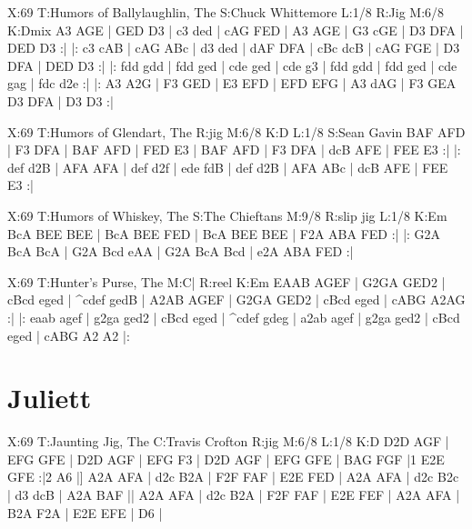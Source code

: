 \documentclass{article}
\begin{document}
\begin{abc}[name]
X:69
T:Humors of Ballylaughlin, The
S:Chuck Whittemore
L:1/8
R:Jig
M:6/8
K:Dmix
A3 AGE | GED D3 | c3 ded | cAG FED |
A3 AGE | G3 cGE | D3 DFA | DED D3 :|
|: c3 cAB | cAG ABc | d3 ded | dAF DFA |
cBc dcB | cAG FGE | D3 DFA | DED D3 :|
|: fdd gdd | fdd ged | cde ged | cde g3 |
fdd gdd | fdd ged | cde gag | fdc d2e :|
|: A3 A2G | F3 GED | E3 EFD | EFD EFG |
A3 dAG | F3 GEA D3 DFA | D3 D3 :|
\end{abc}

\begin{abc}[name]
X:69
T:Humors of Glendart, The
R:jig
M:6/8
K:D
L:1/8
S:Sean Gavin
BAF AFD | F3 DFA | BAF AFD | FED E3 |
BAF AFD | F3 DFA | dcB AFE | FEE E3 :|
|: def d2B | AFA AFA | def d2f | ede fdB |
def d2B | AFA ABc | dcB AFE | FEE E3 :|
\end{abc}

\begin{abc}[name]
X:69
T:Humors of Whiskey, The
S:The Chieftans
M:9/8
R:slip jig
L:1/8
K:Em
BcA BEE BEE | BcA BEE FED | BcA BEE BEE | F2A ABA FED :|
|: G2A BcA BcA | G2A Bcd eAA | G2A BcA Bcd | e2A ABA FED :|
\end{abc}

\begin{abc}[name]
X:69
T:Hunter's Purse, The
M:C|
R:reel
K:Em
EAAB AGEF | G2GA GED2 | cBcd eged | ^cdef gedB |
A2AB AGEF | G2GA GED2 | cBcd eged | cABG A2AG :|
|: eaab agef | g2ga ged2 | cBcd eged | ^cdef gdeg |
a2ab agef | g2ga ged2 | cBcd eged | cABG A2 A2 |:
\end{abc}

\section{Juliett}

\begin{abc}[name]
X:69
T:Jaunting Jig, The
C:Travis Crofton
R:jig
M:6/8
L:1/8
K:D
D2D AGF | EFG GFE | D2D AGF | EFG F3 |
D2D AGF | EFG GFE | BAG FGF |1 E2E GFE :|2 A6 |]
A2A AFA | d2c B2A | F2F FAF | E2E FED |
A2A AFA | d2c B2c | d3 dcB | A2A BAF ||
A2A AFA | d2c B2A | F2F FAF | E2E FEF |
A2A AFA | B2A F2A | E2E EFE | D6 |
\end{abc}
\end{document}
